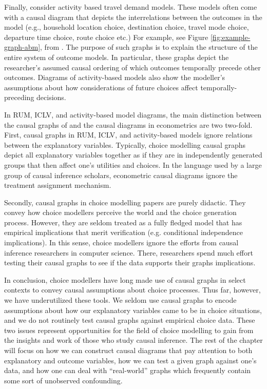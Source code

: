 Finally, consider activity based travel demand models.
These models often come with a causal diagram that depicts the interrelations between the outcomes in the model (e.g., household location choice, destination choice, travel mode choice, departure time choice, route choice etc.)
For example, see Figure \ref{fig:example-graph-abm}, from \citet[Fig.1]{bradley_2010_sacsim}.
The purpose of such graphs is to explain the structure of the entire system of outcome models.
In particular, these graphs depict the researcher's assumed causal ordering of which outcomes temporally precede other outcomes.
Diagrams of activity-based models also show the modeller's assumptions about how considerations of future choices affect temporally-preceding decisions.

In RUM, ICLV, and activity-based model diagrams, the main distinction between the causal graphs of \citet{pearl_1995_causal} and the causal diagrams in econometrics are two two-fold.
First, causal graphs in RUM, ICLV, and activity-based models ignore relations between the explanatory variables.
Typically, choice modelling causal graphs depict all explanatory variables together as if they are in independently generated groups that then affect one's utilities and choices.
In the language used by a large group of causal inference scholars, econometric causal diagrams ignore the treatment assignment mechanism.

Secondly, causal graphs in choice modelling papers are purely didactic.
They convey how choice modellers perceive the world and the choice generation process.
However, they are seldom treated as a fully fledged model that has empirical implications that merit verification (e.g. conditional independence implications).
In this sense, choice modellers ignore the efforts from causal inference researchers in computer science.
There, researchers spend much effort testing their causal graphs to see if the data supports their graphs implications.

In conclusion, choice modellers have long made use of causal graphs in select contexts to convey causal assumptions about choice processes.
Thus far, however, we have underutilized these tools.
We seldom use causal graphs to encode assumptions about how our explanatory variables came to be in choice situations, and we do not routinely test causal graphs against empirical choice data.
These two issues represent opportunities for the field of choice modelling to gain from the insights and work of those who study causal inference.
The rest of the chapter will focus on how we can construct causal diagrams that pay attention to both explanatory and outcome variables, how we can test a given graph against one's data, and how one can deal with ``real-world'' graphs which frequently contain some sort of unobserved confounding.
